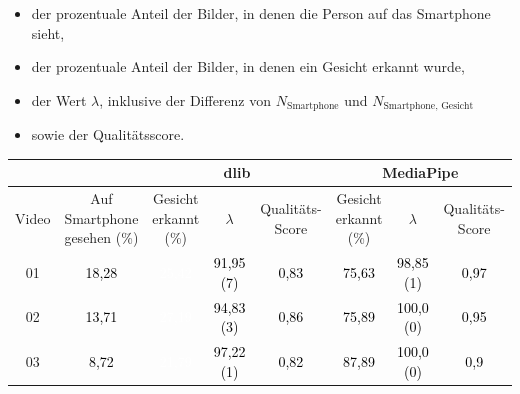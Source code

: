 \begin{itemize}
    \item der prozentuale Anteil der Bilder, in denen die Person auf das Smartphone sieht,
    \item der prozentuale Anteil der Bilder, in denen ein Gesicht erkannt wurde,
    \item der Wert $\lambda$, inklusive der Differenz von $N_{\text{Smartphone}}$ und $N_{\text{Smartphone, Gesicht}}$ 
    \item sowie der Qualitätsscore.
\end{itemize}

\begin{table}[]
    \centering
    \begin{tabular}{c | c | c  c c | c c c}
    \toprule
    & & \multicolumn{3}{c|}{\textbf{dlib}} & \multicolumn{3}{c}{\textbf{MediaPipe}} \\
    \midrule 
    Video 
    & \makecell{Auf\\Smartphone\\gesehen (\%)}
    & \makecell{Gesicht\\erkannt\\(\%)} 
    &  $\lambda$
    & \makecell{Qualitäts-\\Score}
    & \makecell{Gesicht\\erkannt\\(\%)}
    & $\lambda$
    & \makecell{Qualitäts-\\Score} 
    \\
    \hline 
01 & \cellcolor[HTML]{D1D1D1}\textcolor{black}{18,28} & \cellcolor[HTML]{BE4100}\textcolor{white}{25,42} & \cellcolor[HTML]{14EB00}\textcolor{black}{91,95 (7)} & \cellcolor[HTML]{2BD300}\textcolor{black}{0,83}& \cellcolor[HTML]{3EC100}\textcolor{black}{75,63} & \cellcolor[HTML]{01FD00}\textcolor{black}{98,85 (1)} & \cellcolor[HTML]{07F800}\textcolor{black}{0,97} \\
02 & \cellcolor[HTML]{DCDCDC}\textcolor{black}{13,71} & \cellcolor[HTML]{BA4500}\textcolor{white}{27,19} & \cellcolor[HTML]{0DF200}\textcolor{black}{94,83 (3)} & \cellcolor[HTML]{22DC00}\textcolor{black}{0,86}& \cellcolor[HTML]{3DC200}\textcolor{black}{75,89} & \cellcolor[HTML]{00FF00}\textcolor{black}{100,0 (0)} & \cellcolor[HTML]{0CF300}\textcolor{black}{0,95} \\
03 & \cellcolor[HTML]{E9E9E9}\textcolor{black}{8,72} & \cellcolor[HTML]{C83700}\textcolor{white}{21,79} & \cellcolor[HTML]{07F800}\textcolor{black}{97,22 (1)} & \cellcolor[HTML]{2ED100}\textcolor{black}{0,82}& \cellcolor[HTML]{1FE000}\textcolor{black}{87,89} & \cellcolor[HTML]{00FF00}\textcolor{black}{100,0 (0)} & \cellcolor[HTML]{18E600}\textcolor{black}{0,9} \\

\end{tabular}
\end{table}
